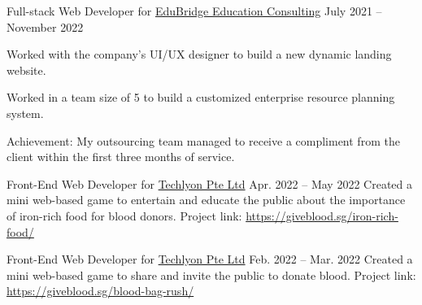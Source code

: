 \begin{cventries}

\cventry
{Full-stack Web Developer for \href{https://www.edubridge.co.id/}{EduBridge Education Consulting}} %
{} %
{} %
{July 2021 -- November 2022} %
{ %
\begin{cvitems}
\item {Worked with the company's UI/UX designer to build a new dynamic landing website.}
\item {Worked in a team size of 5 to build a customized enterprise resource planning system.}
\end{cvitems}
\vspace{4mm}
Achievement: My outsourcing team managed to receive a compliment from the client within the first three months of service.
}




\cventry
{Front-End Web Developer for \href{https://helloakin.com/}{Techlyon Pte Ltd}} %
{} %
{} %
{Apr. 2022 -- May 2022} %
{ %
Created a mini web-based game to entertain and educate the public about the importance of iron-rich food for blood donors.
\linebreak
Project link: \href{https://giveblood.sg/iron-rich-food/}{https://giveblood.sg/iron-rich-food/}
}


\cventry
{Front-End Web Developer for \href{https://helloakin.com/}{Techlyon Pte Ltd}} %
{} %
{} %
{Feb. 2022 -- Mar. 2022} %
{ %
Created a mini web-based game to share and invite the public to donate blood.
\linebreak
Project link: \href{https://giveblood.sg/blood-bag-rush/}{https://giveblood.sg/blood-bag-rush/}
}


\end{cventries}
